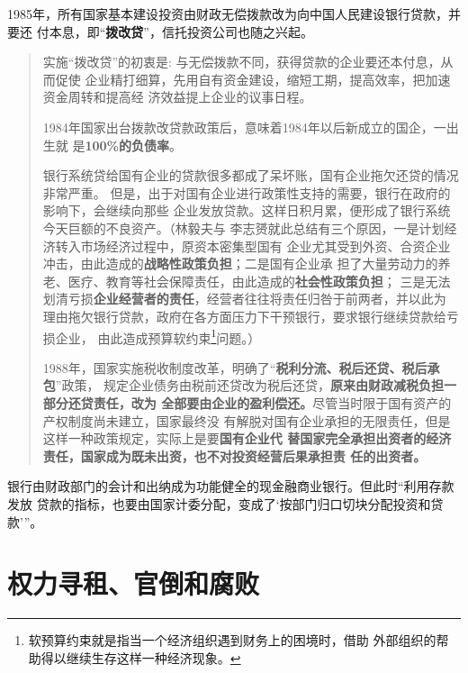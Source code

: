 1985年，所有国家基本建设投资由财政无偿拨款改为向中国人民建设银行贷款，并要还
付本息，即“\textbf{拨改贷}”，信托投资公司也随之兴起。
\begin{quotation}
  实施“拨改贷”的初衷是: 与无偿拨款不同，获得贷款的企业要还本付息，从而促使
  企业精打细算，先用自有资金建设，缩短工期，提高效率，把加速资金周转和提高经
  济效益提上企业的议事日程。

  1984年国家出台拨款改贷款政策后，意味着1984年以后新成立的国企，一出生就
  是\textbf{100\%的负债率}。\cite{bogaidaizhaizhuangu}


  银行系统贷给国有企业的贷款很多都成了呆坏账，国有企业拖欠还贷的情况非常严重。
  但是，出于对国有企业进行政策性支持的需要，银行在政府的影响下，会继续向那些
  企业发放贷款。这样日积月累，便形成了银行系统今天巨额的不良资产。（林毅夫与
  李志赟就此总结有三个原因，一是计划经济转入市场经济过程中，原资本密集型国有
  企业尤其受到外资、合资企业冲击，由此造成的\textbf{战略性政策负担}；二是国有企业承
  担了大量劳动力的养老、医疗、教育等社会保障责任，由此造成的\textbf{社会性政策负担}；
  三是无法划清亏损\textbf{企业经营者的责任}，经营者往往将责任归咎于前两者，并以此为
  理由拖欠银行贷款，政府在各方面压力下干预银行，要求银行继续贷款给亏损企业，
  由此造成预算软约束\footnote{软预算约束就是指当一个经济组织遇到财务上的困境时，借助
    外部组织的帮助得以继续生存这样一种经济现象。}问题。）\cite{guoyoujinrong}

  1988年，国家实施税收制度改革，明确了“\textbf{税利分流、税后还贷、税后承包}”政策，
  规定企业债务由税前还贷改为税后还贷，\textbf{原来由财政减税负担一部分还贷责任，改为
  全部要由企业的盈利偿还。}尽管当时限于国有资产的产权制度尚未建立，国家最终没
  有解脱对国有企业承担的无限责任，但是这样一种政策规定，实际上是要\textbf{国有企业代
  替国家完全承担出资者的经济责任，国家成为既未出资，也不对投资经营后果承担责
  任的出资者。}\cite{bogaidai30}
\end{quotation}

银行由财政部门的会计和出纳成为功能健全的现金融商业银行。但此时“利用存款发放
贷款的指标，也要由国家计委分配，变成了`按部门归口切块分配投资和贷款'”。




\section{权力寻租、官倒和腐败}

